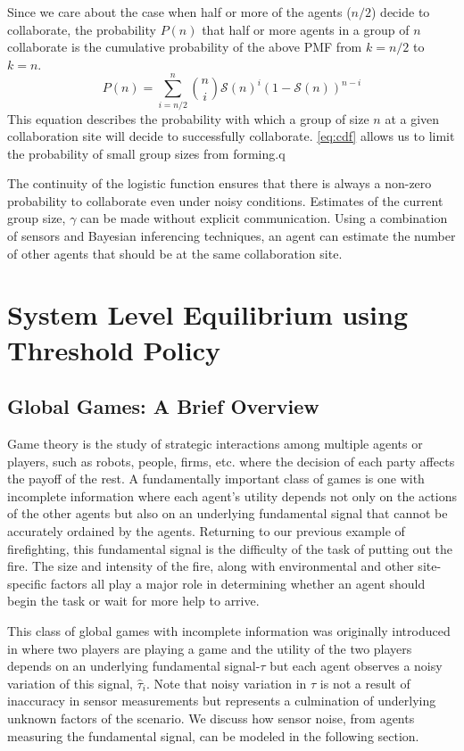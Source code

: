 \documentclass[conference]{ieeeconf}
\def\estt{\hat{\tau}}
\def\estg{\gamma}
\newcommand{\sig}{\mathcal{S}}
\begin{document}
Since we care about the case when half or more of the agents ($n/2$) decide to collaborate, the probability $P(n)$ that half or more agents in a group of $n$ collaborate is the cumulative probability of the above PMF from $k = {n/2}$ to $k = n$. 
\begin{equation}
	P(n) = \sum\limits_{i={n/2}}^{n}\binom{n}{i}\sig(n)^{i}\left(1 - \sig(n)\right)^{n - i}\label{eq:cdf}
\end{equation}
This equation describes the probability with which a group of size $n$ at a given collaboration site will decide to successfully collaborate. \eqref{eq:cdf} allows us to limit the probability of small group sizes from forming.q 

The continuity of the logistic function ensures that there is always a non-zero probability to collaborate even under noisy conditions. Estimates of the current group size, $\estg$ can be made without explicit communication. Using a combination of sensors and Bayesian inferencing techniques, an agent can estimate the number of other agents that should be at the same collaboration site.

\section{System Level Equilibrium using Threshold Policy}\label{sec:ggames}
\subsection{Global Games: A Brief Overview}\label{sec:ggoverview}
Game theory is the study of strategic interactions among multiple agents or players, such as robots, people, firms, etc. where the decision of each party affects the payoff of the rest. A fundamentally important class of games is one with incomplete information where each agent's utility depends not only on the actions of the other agents but also on an underlying fundamental signal that cannot be accurately ordained by the agents. Returning to our previous example of firefighting, this fundamental signal is the difficulty of the task of putting out the fire. The size and intensity of the fire, along with environmental and other site-specific factors all play a major role in determining whether an agent should begin the task or wait for more help to arrive. 

This class of global games with incomplete information was originally introduced in \cite{Carlsson1993} where two players are playing a game and the utility of the two players depends on an underlying fundamental signal-$\tau$ but each agent observes a noisy variation of this signal, $\estt_i$. Note that noisy variation in $\tau$ is not a result of inaccuracy in sensor measurements but represents a culmination of underlying unknown factors of the scenario. We discuss how sensor noise, from agents measuring the fundamental signal, can be modeled in the following section.
\end{document}
